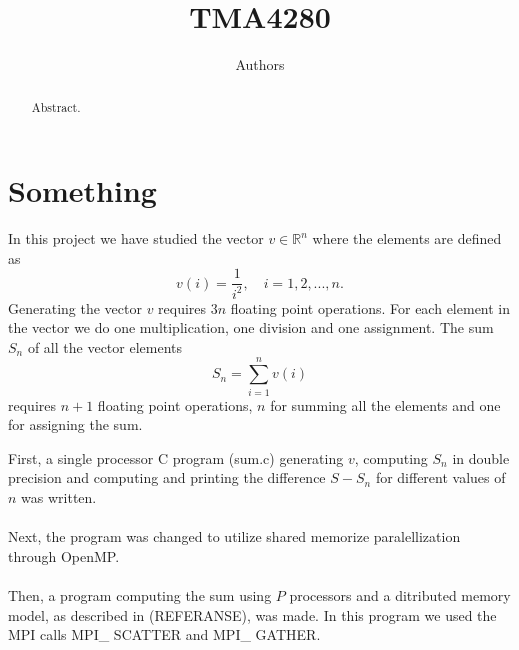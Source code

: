 \documentclass{article}
\title{TMA4280}
\author{Authors}
\begin{document}
\maketitle

\begin{abstract}
Abstract. 
\end{abstract}

\newpage
\section*{Something}
In this project we have studied the vector $v \in \mathbb{R}^n$ where the elements are defined as 
\begin{equation}
\label{vdefinition}
	v(i) =\frac{1}{i^2},\quad i = 1,2,...,n.
\end{equation}
Generating the vector $v$ requires $3n$ floating point operations. For each element in the vector we do one multiplication, one division and one assignment.  
The sum $S_n$ of all the vector elements 
\begin{equation}
\label{Sdefinition}
	S_n = \sum_{i=1}^n v(i)
\end{equation}
requires $n+1$ floating point operations, $n$ for summing all the elements and one for assigning the sum.

First, a single processor C program (sum.c) generating $v$, computing $S_n$ in double precision and computing and printing the difference $S - S_n$ for different values of $n$ was written. 
\\\\
Next, the program was changed to utilize shared memorize paralellization through OpenMP. 
\\\\
Then, a program computing the sum using $P	$ processors and a ditributed memory model, as described in (REFERANSE), was made. In this program we used the MPI calls MPI\_ SCATTER and MPI\_ GATHER. 
\end{document}
